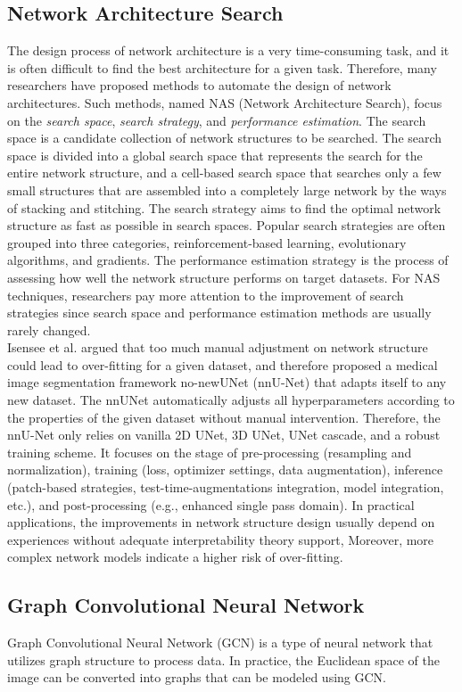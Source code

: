\subsection{Network Architecture Search}
The design process of network architecture is a very time-consuming task, and
it is often difficult to find the best architecture for a given task. Therefore,
many researchers have proposed methods to automate the design of network
architectures. Such methods, named NAS (Network Architecture Search), focus on
the \emph{search space}, \emph{search strategy}, and \emph{performance
estimation}.
The search space is a candidate collection of network structures to be searched.
The search space is divided into a global search space that represents the
search for the entire network structure, and a cell-based search space that
searches only a few small structures that are assembled into a completely large
network by the ways of stacking and stitching. The search strategy aims to find
the optimal network structure as fast as possible in search spaces. Popular
search strategies are often grouped into three categories, reinforcement-based
learning, evolutionary algorithms, and gradients. The performance estimation
strategy is the process of assessing how well the network structure performs on
target datasets. For NAS techniques, researchers pay more attention to the
improvement of search strategies since search space and performance estimation
methods are usually rarely changed.\\
Isensee et al. argued that too much manual adjustment on network structure could
lead to over-fitting for a given dataset, and therefore proposed a medical image
segmentation framework no-newUNet (nnU-Net) that adapts itself to any new
dataset. The nnUNet automatically adjusts all hyperparameters according to the
properties of the given dataset without manual intervention. Therefore, the
nnU-Net only relies on vanilla 2D UNet, 3D UNet, UNet cascade, and a robust
training scheme. It focuses on the stage of pre-processing (resampling and
normalization), training (loss, optimizer settings, data augmentation),
inference (patch-based strategies, test-time-augmentations integration, model
integration, etc.), and post-processing (e.g., enhanced single pass domain). In
practical applications, the improvements in network structure design usually
depend on experiences without adequate interpretability theory support,
Moreover, more complex network models indicate a higher risk of over-fitting.


\subsection{Graph Convolutional Neural Network}
Graph Convolutional Neural Network (GCN) is a type of neural network that
utilizes graph structure to process data. In practice, the Euclidean space of the
image can be converted into graphs that can be modeled using GCN.

